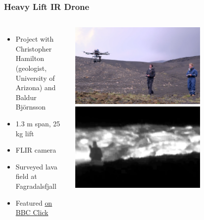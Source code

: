 \documentclass[aspectratio=169]{rubeamer}
\begin{document}
\begin{frame}
  \frametitle{Heavy Lift IR Drone}
  \begin{columns}
    \begin{itemize}
      \item Project with Christopher Hamilton (geologist, University of Arizona) and Baldur Björnsson
      \item 1.3 m span, 25 kg lift
      \item FLIR camera
      \item Surveyed lava field at Fagradalsfjall
      \item Featured \href{https://youtu.be/6SIgFPhhRPE?t=1208}{\color{blue}on BBC Click}
    \end{itemize}
    \centering
    \includegraphics[width=0.7\textwidth]{ir_drone_in_flight}
    \includegraphics[width=0.7\textwidth]{ir_drone_ir_stillframe}
  \end{columns}
\end{frame}
\end{document}
